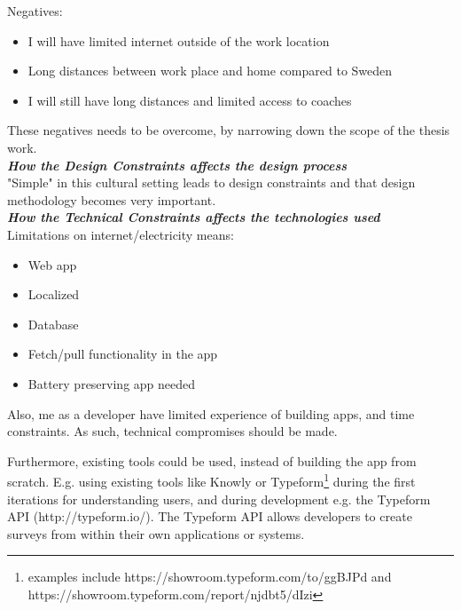 Negatives:
\begin{itemize}
    \item I will have limited internet outside of the work location
    \item Long distances between work place and home compared to Sweden
    \item I will still have long distances and limited access to coaches\\
\end{itemize}

These negatives needs to be overcome, by narrowing down the scope of the thesis work. \\

\textbf{\textit{How the Design Constraints affects the design process}}\\
"Simple" in this cultural setting leads to design constraints and that design methodology becomes very important.\\

\textbf{\textit{How the Technical Constraints affects the technologies used}}\\
Limitations on internet/electricity means:

\begin{itemize}
    \item Web app
    \item Localized
    \item Database
    \item Fetch/pull functionality in the app
    \item Battery preserving app needed
\end{itemize}

Also, me as a developer have limited experience of building apps, and time constraints. As such, technical compromises should be made.

Furthermore, existing tools could be used, instead of building the app from scratch. E.g. using existing tools like Knowly or Typeform\footnote{examples include https://showroom.typeform.com/to/ggBJPd and https://showroom.typeform.com/report/njdbt5/dIzi} during the first iterations for understanding users, and during development e.g. the Typeform API (http://typeform.io/). The Typeform API allows developers to create surveys from within their own applications or systems. \\